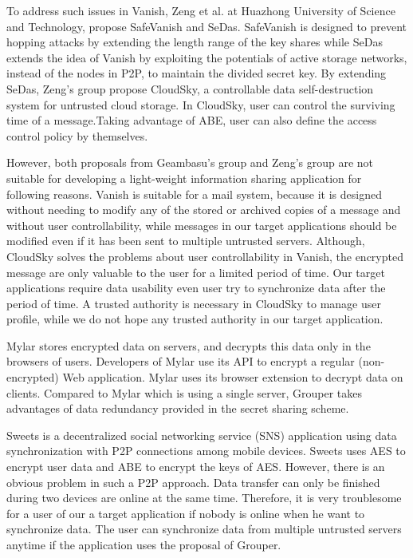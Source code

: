 \documentclass[twocolumn,10pt]{article}
\begin{document}
To address such issues in Vanish, Zeng et al. at Huazhong University of Science and Technology, propose SafeVanish and SeDas. 
SafeVanish is designed to prevent hopping attacks by extending the length range of the key shares while SeDas extends the idea of Vanish by exploiting the potentials of active storage networks, instead of the nodes in P2P, to maintain the divided secret key. By extending SeDas, Zeng's group propose CloudSky, a controllable data self-destruction system for untrusted cloud storage. 
In CloudSky, user can control the surviving time of a message.Taking advantage of ABE, user can also define the access control policy by themselves.

However, both proposals from Geambasu's group and Zeng's group are not suitable for developing a light-weight information sharing application for following reasons. 
Vanish is suitable for a mail system, because it is designed without needing to modify any of the stored or archived copies of a message and without user controllability, while messages in our target applications should be modified even if it has been sent to multiple untrusted servers.  
Although, CloudSky solves the problems about user controllability in Vanish, the encrypted message are only valuable to the user for a limited period of time.
Our target applications require data usability even user try to synchronize data after the period of time. 
A trusted authority is necessary in CloudSky to manage user profile, while we do not hope any trusted authority in our target application.

Mylar stores encrypted data on servers, and decrypts this data only in the browsers of users. 
Developers of Mylar use its API to encrypt a regular (non-encrypted) Web application. 
Mylar uses its browser extension to decrypt data on clients. 
Compared to Mylar which is using a single server, Grouper takes advantages of data redundancy provided in the secret sharing scheme.

Sweets is a decentralized social networking service (SNS) application using data synchronization with P2P connections among mobile devices. 
Sweets uses AES to encrypt user data and ABE to encrypt the keys of AES. 
However, there is an obvious problem in such a P2P approach. 
Data transfer can only be finished during two devices are online at the same time. 
Therefore, it is very troublesome for a user of our a target application if nobody is online when he want to synchronize data.
The user can synchronize data from multiple untrusted servers anytime if the application uses the proposal of Grouper.
\end{document}
